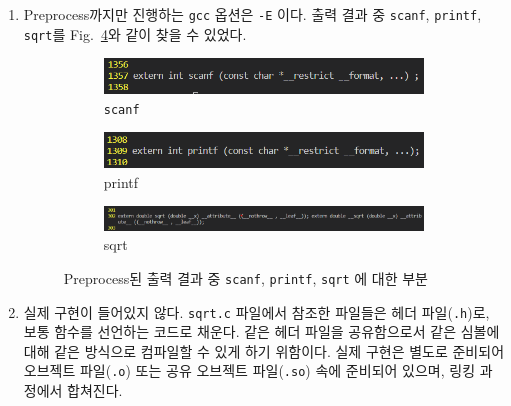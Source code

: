 \begin{enumerate}[label= (\alph*)]
    \item {
        Preprocess까지만 진행하는 \texttt{gcc} 옵션은 \texttt{-E} 이다.
        출력 결과 중 \texttt{scanf}, \texttt{printf}, \texttt{sqrt}를 Fig.~\ref{fig:1-2}와 같이 찾을 수 있었다.

        \begin{figure}
            \centering
            \begin{subfigure}[b]{0.48\textwidth}
                \centering
                \includegraphics[width=\textwidth]{imgs/Figure02_scanf.png}
                \caption{\texttt{scanf}}
                \label{fig:scanf declaration}
            \end{subfigure}
            \hfill
            \begin{subfigure}[b]{0.48\textwidth}
                \centering
                \includegraphics[width=\textwidth]{imgs/Figure03_printf.png}
                \caption{printf}
                \label{fig:printf declaration}
            \end{subfigure}
            \hfill
            \begin{subfigure}[b]{\textwidth}
                \centering
                \includegraphics[width=\textwidth]{imgs/Figure04_sqrt.png}
                \caption{sqrt}
                \label{fig:sqrt declaration}
            \end{subfigure}
            \caption{
                Preprocess된 출력 결과 중 \texttt{scanf}, \texttt{printf}, \texttt{sqrt}
                에 대한 부분
            }
            \label{fig:1-2}
       \end{figure}
    }

    \item {
        실제 구현이 들어있지 않다. \texttt{sqrt.c} 파일에서 참조한 파일들은 헤더 파일(\texttt{.h})로,
        보통 함수를 선언하는 코드로 채운다. 같은 헤더 파일을 공유함으로서 같은 심볼에 대해 같은 방식으로
        컴파일할 수 있게 하기 위함이다. 실제 구현은 별도로 준비되어 오브젝트 파일(\texttt{.o}) 또는
        공유 오브젝트 파일(\texttt{.so}) 속에 준비되어 있으며, 링킹 과정에서 합쳐진다.
    }
    
\end{enumerate}

